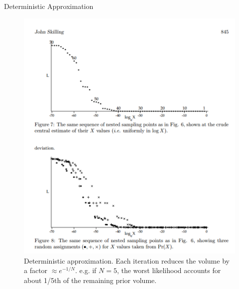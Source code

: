 \documentclass{beamer}
\begin{document}
\begin{frame}[t]{Deterministic Approximation}
\begin{figure}
\centering
\includegraphics[scale=0.25]{figures/deterministic.pdf}
\caption{Deterministic approximation. Each iteration reduces
the volume by a factor $\approx e^{-1/N}$. e.g. if $N=5$, the worst likelihood
accounts for about 1/5th of the remaining prior volume.}
\end{figure}
\end{frame}
\end{document}

